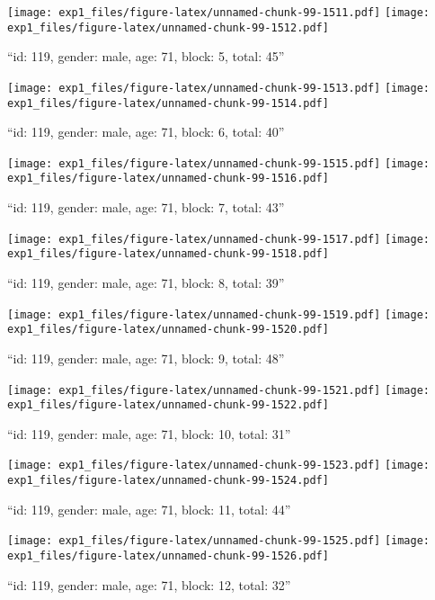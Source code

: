 \documentclass[,]{article}
\begin{document}
\texttt{[image: exp1\_files/figure-latex/unnamed-chunk-99-1511.pdf]}
\texttt{[image: exp1\_files/figure-latex/unnamed-chunk-99-1512.pdf]}

\newpage
[1] 

``id: 119, gender: male, age: 71, block: 5, total: 45''

\texttt{[image: exp1\_files/figure-latex/unnamed-chunk-99-1513.pdf]}
\texttt{[image: exp1\_files/figure-latex/unnamed-chunk-99-1514.pdf]}

\newpage
[1] 

``id: 119, gender: male, age: 71, block: 6, total: 40''

\texttt{[image: exp1\_files/figure-latex/unnamed-chunk-99-1515.pdf]}
\texttt{[image: exp1\_files/figure-latex/unnamed-chunk-99-1516.pdf]}

\newpage
[1] 

``id: 119, gender: male, age: 71, block: 7, total: 43''

\texttt{[image: exp1\_files/figure-latex/unnamed-chunk-99-1517.pdf]}
\texttt{[image: exp1\_files/figure-latex/unnamed-chunk-99-1518.pdf]}

\newpage
[1] 

``id: 119, gender: male, age: 71, block: 8, total: 39''

\texttt{[image: exp1\_files/figure-latex/unnamed-chunk-99-1519.pdf]}
\texttt{[image: exp1\_files/figure-latex/unnamed-chunk-99-1520.pdf]}

\newpage
[1] 

``id: 119, gender: male, age: 71, block: 9, total: 48''

\texttt{[image: exp1\_files/figure-latex/unnamed-chunk-99-1521.pdf]}
\texttt{[image: exp1\_files/figure-latex/unnamed-chunk-99-1522.pdf]}

\newpage
[1] 

``id: 119, gender: male, age: 71, block: 10, total: 31''

\texttt{[image: exp1\_files/figure-latex/unnamed-chunk-99-1523.pdf]}
\texttt{[image: exp1\_files/figure-latex/unnamed-chunk-99-1524.pdf]}

\newpage
[1] 

``id: 119, gender: male, age: 71, block: 11, total: 44''

\texttt{[image: exp1\_files/figure-latex/unnamed-chunk-99-1525.pdf]}
\texttt{[image: exp1\_files/figure-latex/unnamed-chunk-99-1526.pdf]}

\newpage
[1] 

``id: 119, gender: male, age: 71, block: 12, total: 32''
\end{document}
